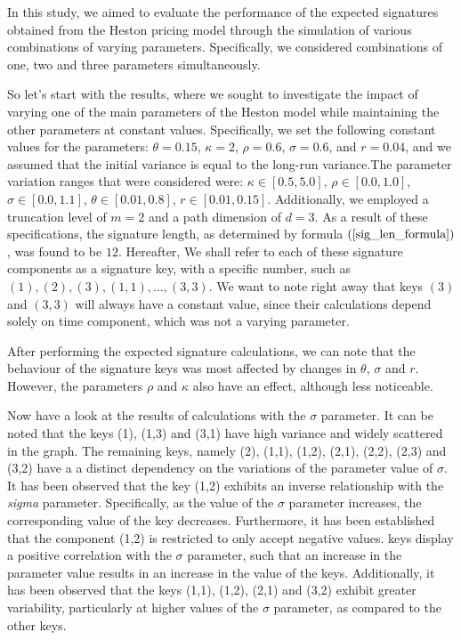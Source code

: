 \documentclass[12pt,a4paper]{report}
\theoremstyle{definition}
\begin{document}
In this study, we aimed to evaluate the performance of the expected signatures obtained from the Heston pricing model through the simulation of various combinations of varying parameters. Specifically, we considered combinations of one, two and three parameters simultaneously. %

So let's start with the results, where we sought to investigate the impact of varying one of the main parameters of the Heston model while maintaining the other parameters at constant values. Specifically, we set the following constant values for the parameters: $\theta=0.15$, $\kappa=2$, $\rho=0.6$, $\sigma=0.6$, and $r=0.04$, and we assumed that the initial variance is equal to the long-run variance.The parameter variation ranges that were considered were: $\kappa\in [0.5,5.0]$, $\rho\in [0.0,1.0]$, $\sigma\in [0.0,1.1]$, $\theta \in [0.01,0.8]$, $r\in [0.01,0.15]$. Additionally, we employed a truncation level of $m=2$ and a path dimension of $d=3$. As a result of these specifications, the signature length, as determined by formula $(\ref{sig_len_formula})$, was found to be $12$. Hereafter, We shall refer to each of these signature components as a signature key, with a specific number, such as $(1), (2), (3), (1,1), ..., (3,3)$. We want to note right away that keys $(3)$ and $(3,3)$ will always have a constant value, since their calculations depend solely on time component, which was not a varying parameter.

After performing the expected signature calculations, we can note that the behaviour of the signature keys was most affected by changes in $\theta$, $\sigma$ and $r$. However, the parameters $\rho$ and $\kappa$ also have an effect, although less noticeable.


Now have a look at the results of calculations with the $\sigma$ parameter. It can be noted that the keys (1), (1,3) and (3,1) have high variance and widely scattered in the graph. The remaining keys, namely (2), (1,1), (1,2), (2,1), (2,2), (2,3) and (3,2) have a a distinct dependency on the variations of the parameter value of $\sigma$. It has been observed that the key (1,2) exhibits an inverse relationship with the \textit{sigma} parameter. Specifically, as the value of the $\sigma$ parameter increases, the corresponding value of the key decreases. Furthermore, it has been established that the component (1,2) is restricted to only accept negative values. keys display a positive correlation with the $\sigma$ parameter, such that an increase in the parameter value results in an increase in the value of the keys. Additionally, it has been observed that the keys (1,1), (1,2), (2,1) and (3,2) exhibit greater variability, particularly at higher values of the $\sigma$ parameter, as compared to the other keys.
\end{document}
